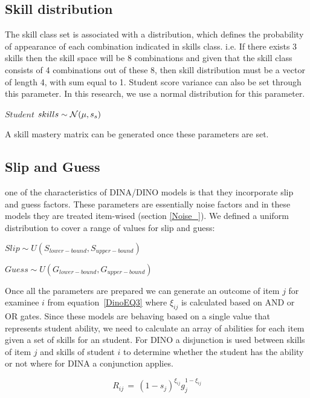 \subsection{Skill distribution}

The skill class set is associated with a distribution, which defines the probability of appearance of each combination indicated in skills class. i.e. If there exists 3 skills then the skill space will be 8 combinations and given that the skill class consists of 4 combinations out of these 8, then skill distribution must be a vector of length 4, with sum equal to 1. Student score variance can also be set through this parameter. In this research, we use a normal distribution for this parameter.



\begin{center}
$Student$  $skills \sim \mathcal{N}(\mu, s_s)$
\end{center}

A skill mastery matrix can be generated once these parameters are set.


\subsection{Slip and Guess}
one of the characteristics of DINA/DINO models is that they incorporate slip and guess factors. These parameters are essentially noise factors and in these models they are treated item-wised (section \ref{Noise_}). We defined a uniform distribution to cover a range of values for slip and guess:


\begin{center}
$Slip \sim \textit{U}(S_{lower-bound}, S_{upper-bound})$

$Guess \sim \textit{U}(G_{lower-bound}, G_{upper-bound})$
\end{center}

Once all the parameters are prepared we can generate an outcome of item $j$ for examinee $i$ from equation~\ref{DinoEQ3} where $\xi_{ij}$ is calculated based on AND or OR gates. Since these models are behaving based on a single value that represents student ability, we need to calculate an array of abilities for each item given a set of skills for an student. For DINO a disjunction is used between skills of item $j$ and skills of student $i$ to determine whether the student has the ability or not where for DINA a conjunction applies.

\begin{equation}
 R_{ij} \,=\, (1-s_j)^{\xi_{ij}} g_j^{1-\xi_{ij}}
\label{DinoEQ3}
\end{equation}

